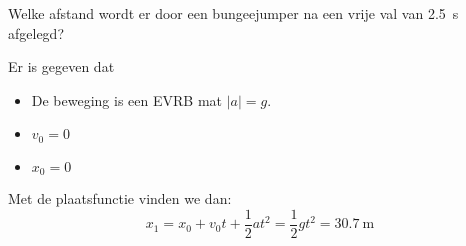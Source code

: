 \documentclass{ximera}
\begin{document}
	\author{Bart Lambregs}
    \xmsource\xmuitleg

\begin{exercise}
    Welke afstand wordt er door een bungeejumper na een vrije val van \SI{2,5}{s} afgelegd?
    \begin{oplossing}

    Er is gegeven dat 
    \begin{itemize}
        \item De beweging is een EVRB mat \(|a| = g\). 
        \item \(v_0 = 0\)
        \item \(x_0 = 0\)
    \end{itemize}

    Met de plaatsfunctie vinden we dan:
    \[
    x_1 = x_0 + v_0 t + \frac{1}{2} a t^2 = \frac{1}{2} g t^2 = \SI{30,7}{\meter}
    \]

    \end{oplossing}
\end{exercise}
\end{document}
